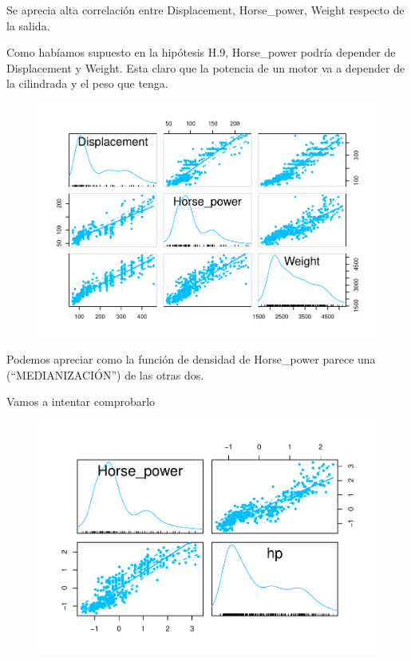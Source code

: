 Se aprecia alta correlación entre Displacement, Horse\_power, Weight respecto de la salida.

Como habíamos supuesto en la hipótesis H.9, Horse\_power podría depender de Displacement y Weight. Esta claro que la potencia de un motor va a depender de la cilindrada y el peso que tenga.

\begin{figure}[H]\includegraphics[width=.9\linewidth]{img/EDA_files/figure-latex/unnamed-chunk-24-1} \caption{}\end{figure}

Podemos apreciar como la función de densidad de Horse\_power parece una (``MEDIANIZACIÓN'') de las otras dos.

Vamos a intentar comprobarlo

\begin{figure}[H]\includegraphics[width=.9\linewidth]{img/EDA_files/figure-latex/unnamed-chunk-25-1} \caption{}\end{figure}

